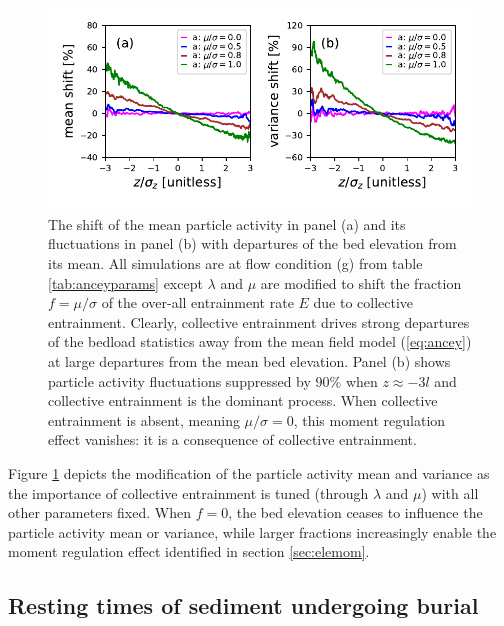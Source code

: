 \begin{figure}[!htbp]
	\includegraphics[width=\linewidth,keepaspectratio]{./figures/ch3/colent-suppression.pdf}
	\caption{The shift of the mean particle activity in panel (a) and its fluctuations in panel (b) with departures of the bed elevation from its mean. All simulations are at flow condition (g) from table \ref{tab:anceyparams} except $\lambda$ and $\mu$ are modified to shift the fraction $f=\mu/\sigma$ of the over-all entrainment rate $E$ due to collective entrainment. Clearly, collective entrainment drives strong departures of the bedload statistics away from the mean field model (\ref{eq:ancey}) at large departures from the mean bed elevation. Panel (b) shows particle activity fluctuations suppressed by 90\% when $z\approx -3l$ and collective entrainment is the dominant process. When collective entrainment is absent, meaning $\mu/\sigma=0$, this moment regulation effect vanishes: it is a consequence of collective entrainment.}
	\label{fig:colent}
\end{figure}
Figure \ref{fig:colent} depicts the modification of the particle activity mean and variance as the importance of collective entrainment is tuned (through $\lambda$ and $\mu$) with all other parameters fixed. When $f=0$, the bed elevation ceases to influence the particle activity mean or variance, while larger fractions increasingly enable the moment regulation effect identified in section \ref{sec:elemom}.

\subsection{Resting times of sediment undergoing burial}
\label{sec:elertcdf}

